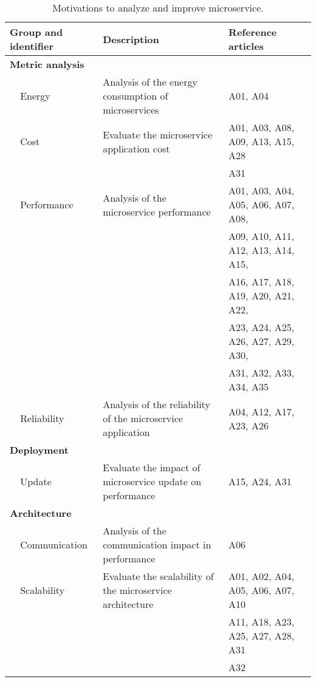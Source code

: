 \begin{table*}[tb]
\centering
\renewcommand{\arraystretch}{1.5}
\caption{Motivations to analyze and improve microservice.}
\label{table_CG2}
\begin{tabular}{llll}
\hline
\multicolumn{2}{l}{Group and identifier} & Description & Reference articles \\ \hline

\multicolumn{2}{l}{\textbf{Metric analysis}} &  &  \\
 & Energy & Analysis of the energy consumption of microservices & A01, A04 \\
 & Cost & Evaluate the microservice application cost & A01, A03, A08, A09, A13, A15, A28 \\
 &  &  & A31 \\
 & Performance & Analysis of the microservice performance & A01, A03, A04, A05, A06, A07, A08, \\
 &  &  & A09, A10, A11, A12, A13, A14, A15, \\
 &  &  & A16, A17, A18, A19, A20, A21, A22, \\
 &  &  & A23, A24, A25, A26, A27, A29, A30, \\
 &  &  & A31, A32, A33, A34, A35 \\
 & Reliability & Analysis of the reliability of the microservice application & A04, A12, A17, A23, A26 \\
 
 \multicolumn{2}{l}{\textbf{Deployment}} &  &  \\
 & Update & Evaluate the impact of microservice update on performance & A15, A24, A31 \\
 
 \multicolumn{2}{l}{\textbf{Architecture}} &  &  \\
 & Communication & Analysis of the communication impact in performance & A06 \\
 & Scalability & Evaluate the scalability of the microservice architecture & A01, A02, A04, A05, A06, A07, A10 \\
 &  &  & A11, A18, A23, A25, A27, A28, A31 \\
 &  &  & A32 \\ \hline
\end{tabular}
\end{table*}